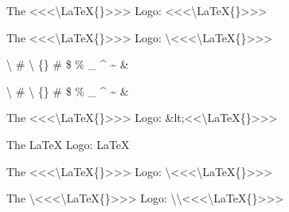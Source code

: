 
The <<<\textbackslash{}LaTeX\{\}>>> Logo: {\mktsStyleCode{}<<<\textbackslash{}LaTeX\{\}>>>}\mktsShowpar\par
The <<<\textbackslash{}LaTeX\{\}>>> Logo: {\mktsStyleCode{}\textbackslash{}<<<\textbackslash{}LaTeX\{\}>>>}\mktsShowpar\par
\textbackslash{} \# \textbackslash{} \{\} \# \$ \% \_ \textasciicircum{} \textasciitilde{} \&\mktsShowpar\par
{\mktsStyleCode{}\textbackslash{} \# \textbackslash{} \{\} \# \$ \% \_ \textasciicircum{} \textasciitilde{} \&}\mktsShowpar\par
The <<<\textbackslash{}LaTeX\{\}>>> Logo: {\mktsStyleCode{}\&lt;<<\textbackslash{}LaTeX\{\}>>>}\mktsShowpar\par
The \LaTeX{} Logo: {\mktsStyleCode{}\LaTeX{}}\mktsShowpar\par
The <<<\textbackslash{}LaTeX\{\}>>> Logo: {\mktsStyleCode{}\textbackslash{}<<<\textbackslash{}LaTeX\{\}>>>}\mktsShowpar\par
The \textbackslash{}<<<\textbackslash{}LaTeX\{\}>>> Logo: {\mktsStyleCode{}\textbackslash{}\textbackslash{}<<<\textbackslash{}LaTeX\{\}>>>}\mktsShowpar\par


